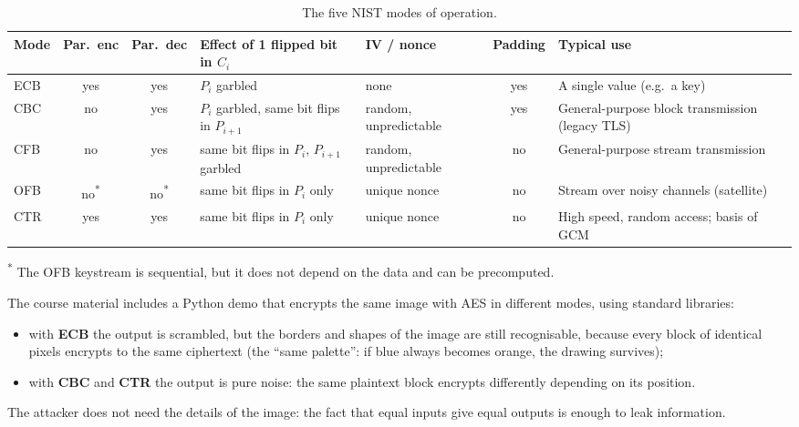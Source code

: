 \begin{table}[H]
\centering
\caption{The five NIST modes of operation.}
\label{tab:modes}
\small
\begin{tabularx}{\textwidth}{@{}l c c >{\raggedright\arraybackslash}X >{\raggedright\arraybackslash}p{2.3cm} c >{\raggedright\arraybackslash}X@{}}
\toprule
Mode & Par.\ enc & Par.\ dec & Effect of 1 flipped bit in $C_i$ & IV / nonce & Padding & Typical use \\
\midrule
ECB & yes & yes & $P_i$ garbled & none & yes & A single value (e.g.\ a key) \\
CBC & no  & yes & $P_i$ garbled, same bit flips in $P_{i+1}$ & random, unpredictable & yes & General-purpose block transmission (legacy TLS) \\
CFB & no  & yes & same bit flips in $P_i$, $P_{i+1}$ garbled & random, unpredictable & no & General-purpose stream transmission \\
OFB & no\textsuperscript{*} & no\textsuperscript{*} & same bit flips in $P_i$ only & unique nonce & no & Stream over noisy channels (satellite) \\
CTR & yes & yes & same bit flips in $P_i$ only & unique nonce & no & High speed, random access; basis of GCM \\
\bottomrule
\end{tabularx}

\smallskip
{\footnotesize \textsuperscript{*} The OFB keystream is sequential, but it does not depend on the data and can be precomputed.}
\end{table}

\begin{example}
\label{ex:image-demo}
The course material includes a Python demo that encrypts the same image with AES in different modes, using standard libraries:
\begin{itemize}
    \item with \textbf{ECB} the output is scrambled, but the borders and shapes of the image are still recognisable, because every block of identical pixels encrypts to the same ciphertext (the \enquote{same palette}: if blue always becomes orange, the drawing survives);
    \item with \textbf{CBC} and \textbf{CTR} the output is pure noise: the same plaintext block encrypts differently depending on its position.
\end{itemize}
The attacker does not need the details of the image: the fact that equal inputs give equal outputs is enough to leak information.
\end{example}

